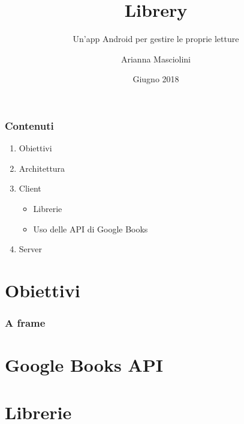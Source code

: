\documentclass{beamer}
\title{Libre\textcolor{ProgBarBGColor}{ry}}
\subtitle{Un'app Android per gestire le proprie letture}
\author{Arianna Masciolini}
\institute{Università degli Studi di Perugia}
\date{Giugno 2018}
\begin{document}
	\setcounter{showProgressBar}{0}
	\setcounter{showSlideNumbers}{0}
	\frame{\titlepage}
	\begin{frame}
		\frametitle{Contenuti}
		\begin{enumerate}
			\item Obiettivi
			\item Architettura
			\item Client
			\begin{itemize}
				\item Librerie
				\item Uso delle API di Google Books
			\end{itemize}
			\item Server
		\end{enumerate}
	\end{frame}
	\setcounter{framenumber}{0}
	\setcounter{showProgressBar}{1}
	\setcounter{showSlideNumbers}{1}
	\section{Obiettivi}
	\begin{frame}
		\frametitle{A frame}
	\end{frame}
\section{Google Books API}
\section{Librerie}
\end{document}
